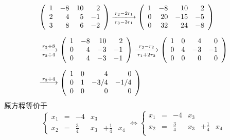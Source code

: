 \begin{frame}[allowframebreaks]
  \begin{jie}
    $$
    \begin{array}{l}
      \left(
      \begin{array}{rrrr}
        1&-8&10&2\\
        2&4&5&-1\\
        3&8&6&-2
      \end{array}
               \right) \xlongrightarrow[r_3-3r_1]{r_2-2r_1}
               \left(
               \begin{array}{rrrr}
                 1&-8&10&2\\
                 0&20&-15&-5\\
                 0&32&24&-8
               \end{array}
                          \right)\\[0.3in]
      \xlongrightarrow[r_2\div4]{r_3\div8}
      \left(
      \begin{array}{rrrr}
        1&-8&10&2\\
        0&4&-3&-1\\
        0&4&-3&-1
      \end{array}
                \right) \xlongrightarrow[r_1+2r_2]{r_3-r_2}
                \left(
                \begin{array}{rrrr}
                  1&0&4&0\\
                  0&4&-3&-1\\
                  0&0&0&0
                \end{array}
                         \right) \\[0.3in]
      \xlongrightarrow[]{r_2\div4}
      \left(
      \begin{array}{rrrr}
        1&0&4&0\\
        0&1&-3/4&-1/4\\
        0&0&0&0
      \end{array}
               \right)
    \end{array}
    $$
    原方程等价于
    $$\left\{
      \begin{array}{rcrcrc}
        x_1&=&-4&x_3&&\\[0.1in]
        x_2&=&\frac34&x_3&+\frac14&x_4
      \end{array}
    \right.  \Leftrightarrow
    \left\{
      \begin{array}{rcrcrc}
        x_1&=&-4&x_3&&\\[0.1in]
        x_2&=&\frac34&x_3&+\frac14&x_4\\[0.1in]

\end{array}$$
\end{jie}
\end{frame}

